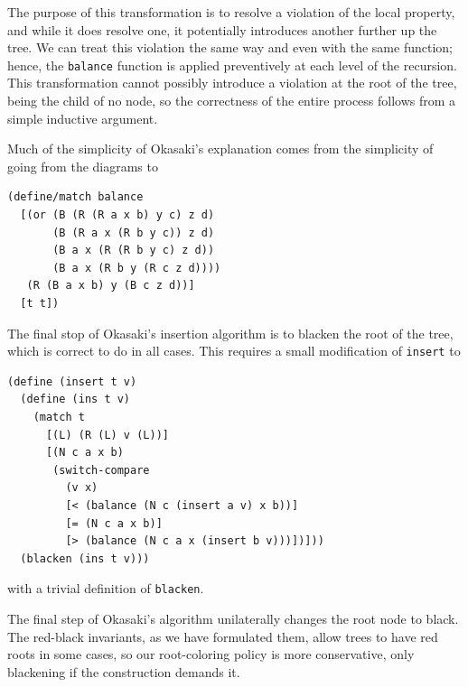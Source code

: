 \documentclass[preprint]{sigplanconf}
\begin{document}
The purpose of this transformation is to resolve a violation of the local property, and while it does resolve one, it potentially introduces another further up the tree. We can treat this violation the same way and even with the same function; hence, the \texttt{balance} function is applied preventively at each level of the recursion. This transformation cannot possibly introduce a violation at the root of the tree, being the child of no node, so the correctness of the entire process follows from a simple inductive argument.

Much of the simplicity of Okasaki's explanation comes from the simplicity of going from the diagrams to
\begin{verbatim}
(define/match balance
  [(or (B (R (R a x b) y c) z d)
       (B (R a x (R b y c)) z d)
       (B a x (R (R b y c) z d))
       (B a x (R b y (R c z d))))
   (R (B a x b) y (B c z d))]
  [t t])
\end{verbatim}

The final stop of Okasaki's insertion algorithm is to blacken the root of the tree, which is correct to do in all cases. This requires a small modification of \texttt{insert} to 
\begin{verbatim}
(define (insert t v)
  (define (ins t v)
    (match t
      [(L) (R (L) v (L))]
      [(N c a x b)
       (switch-compare
         (v x)
         [< (balance (N c (insert a v) x b))]
         [= (N c a x b)]
         [> (balance (N c a x (insert b v)))])]))
  (blacken (ins t v)))
\end{verbatim}
with a trivial definition of \texttt{blacken}.




The final step of Okasaki's algorithm unilaterally changes the root node to black. The red-black invariants, as we have formulated them, allow trees to have red roots in some cases, so our root-coloring policy is more conservative, only blackening if the construction demands it.
\end{document}
